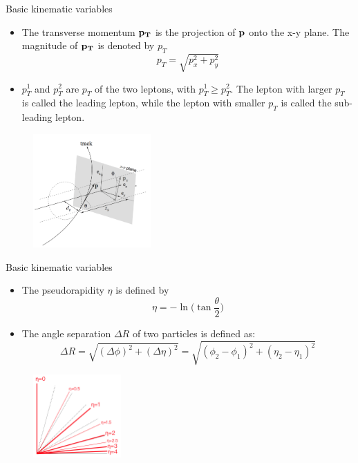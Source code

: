 \documentclass[mathserif,serif]{beamer}
\begin{document}
\begin{frame}{Basic kinematic variables}
\begin{itemize}
\item The transverse momentum $\bf{p}_T$ is the projection of $\bf{p}$ onto the x-y plane. The magnitude of $\bf{p}_T$ is denoted by $p_T$
\begin{equation*}
p_T = \sqrt{p_x^2 + p_y^2}
\end{equation*}
\item $p_T^1$ and $p_T^2$ are $p_T$ of the two leptons, with $p_T^1 \geq p_T^2$. The lepton with larger $p_T$ is called the leading lepton, while the lepton with smaller $p_T$ is called the sub-leading lepton.
\end{itemize}
\begin{figure}
\centering
\includegraphics[width=0.4\textwidth]{data/photo/detector/impact_parameter.png}
\end{figure}
\end{frame}

\begin{frame}{Basic kinematic variables}
\begin{itemize}
\item The pseudorapidity $\eta$ is defined by
\begin{equation*}
\eta = - \ln \Big( \tan \frac{\theta}{2} \Big)
\end{equation*}
\item The angle separation $\Delta R$ of two particles is defined as:
\begin{equation*}
\Delta R = \sqrt{(\Delta \phi) ^2 + (\Delta \eta) ^2}  = \sqrt{(\phi_2 -\phi_1) ^2 + (\eta_2 - \eta_1) ^2}
\end{equation*}
\end{itemize}
\begin{figure}
\centering
\includegraphics[width=0.3\textwidth]{data/photo/detector/pseudorapidity.png}
\end{figure}
\end{frame}
\end{document}
